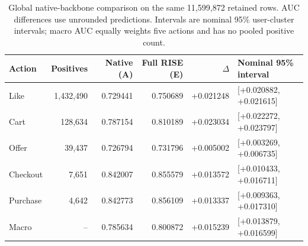 \begin{table}[t]
\centering\small
\caption{Global native-backbone comparison on the same 11,599,872 retained rows.
AUC differences use unrounded predictions. Intervals are nominal 95\%
user-cluster intervals; macro AUC equally weights five actions and has no
pooled positive count.}
\label{tab:native_global_auc}
\begin{tabular}{lrrrrl}\toprule
Action & Positives & Native (A) & Full RISE (E) & $\Delta$ & Nominal 95\% interval \\
\midrule
Like & 1,432,490 & 0.729441 & 0.750689 & +0.021248 & [+0.020882, +0.021615] \\
Cart & 128,634 & 0.787154 & 0.810189 & +0.023034 & [+0.022272, +0.023797] \\
Offer & 39,437 & 0.726794 & 0.731796 & +0.005002 & [+0.003269, +0.006735] \\
Checkout & 7,651 & 0.842007 & 0.855579 & +0.013572 & [+0.010433, +0.016711] \\
Purchase & 4,642 & 0.842773 & 0.856109 & +0.013337 & [+0.009363, +0.017310] \\
Macro & -- & 0.785634 & 0.800872 & +0.015239 & [+0.013879, +0.016599] \\
\bottomrule\end{tabular}
\end{table}

